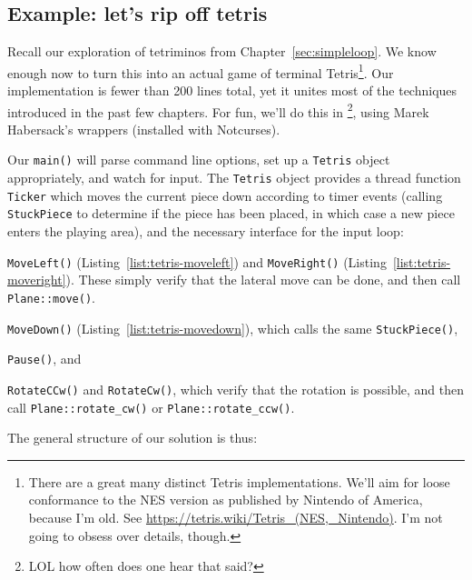 \subsection{Example: let's rip off tetris}
\label{sec:casestudy}
Recall our exploration of tetriminos from Chapter~\ref{sec:simpleloop}. We
know enough now to turn this into an actual game of terminal Tetris\footnote{There
are a great many distinct Tetris implementations. We'll aim for loose
conformance to the NES version as published by Nintendo of America, because
I'm old. See \url{https://tetris.wiki/Tetris_(NES,_Nintendo)}. I'm not going
to obsess over details, though.}. Our implementation is fewer than 200 lines
total, yet it unites most of the techniques introduced in the past few
chapters. For fun, we'll do this in \CC\footnote{LOL how often does one hear
that said?}, using Marek Habersack's \CC wrappers (installed with Notcurses).

Our \texttt{main()} will parse command line options, set up a \texttt{Tetris}
object appropriately, and watch for input. The \texttt{Tetris} object provides
a thread function \texttt{Ticker} which moves the current piece down according
to timer events (calling \texttt{StuckPiece} to determine if the piece has been
placed, in which case a new piece enters the playing area), and the necessary
interface for the input loop:

\begin{denseitemize}
\item{\texttt{MoveLeft()} (Listing~\ref{list:tetris-moveleft}) and \texttt{MoveRight()}
    (Listing~\ref{list:tetris-moveright}). These simply verify that the lateral
    move can be done, and then call \texttt{Plane::move()}.}
\item{\texttt{MoveDown()} (Listing~\ref{list:tetris-movedown}), which calls the same \texttt{StuckPiece()},}
\item{\texttt{Pause()}, and}
\item{\texttt{RotateCCw()} and \texttt{RotateCw()}, which verify that the rotation
      is possible, and then call \texttt{Plane::rotate\_cw()} or \texttt{Plane::rotate\_ccw()}.}
\end{denseitemize}

The general structure of our solution is thus:

